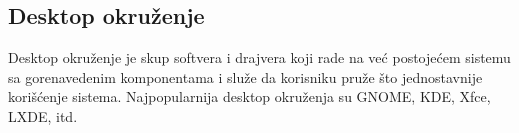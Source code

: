 \subsection{Desktop okruženje}
Desktop okruženje je skup softvera i drajvera koji rade na već postojećem sistemu sa gorenavedenim komponentama i služe da korisniku pruže što jednostavnije korišćenje sistema. Najpopularnija desktop okruženja su GNOME, KDE, Xfce, LXDE, itd.
\begin{figure}[h]
	\centering
    \qquad
\end{figure}
\begin{figure}[h]
	\centering
    \qquad
\end{figure}